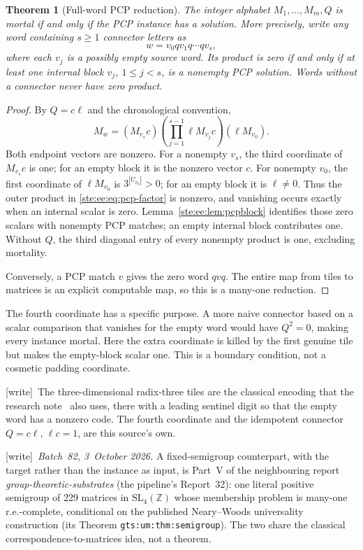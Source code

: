 \documentclass[11pt,letterpaper]{article}
\newtheorem{theorem}{Theorem}[section]
\theoremstyle{definition}
\theoremstyle{remark}
\newcommand{\wtag}{\textup{[write]}}
\begin{document}
\begin{theorem}[Full-word PCP reduction]\label{ste:ee:thm:pcp}
The integer alphabet $M_1,\ldots,M_m,Q$ is mortal if and only if the PCP instance
has a solution. More precisely, write any word containing $s\geq1$ connector
letters as
\[
 w=v_0qv_1q\cdots qv_s,
\]
where each $v_j$ is a possibly empty source word. Its product is zero if and only
if at least one internal block $v_j$, $1\leq j<s$, is a nonempty PCP solution.
Words without a connector never have zero product.
\end{theorem}
\begin{proof}
By $Q=c\ell$ and the chronological convention,
\begin{equation}
 M_w=(M_{v_s}c)
 \left(\prod_{j=1}^{s-1}\ell M_{v_j}c\right)(\ell M_{v_0}).
 \label{ste:ee:eq:pcp-factor}
\end{equation}
Both endpoint vectors are nonzero. For a nonempty $v_s$, the third coordinate of
$M_{v_s}c$ is one; for an empty block it is the nonzero vector $c$. For nonempty
$v_0$, the first coordinate of $\ell M_{v_0}$ is $3^{|U_{v_0}|}>0$; for an empty
block it is $\ell\ne0$. Thus the outer product in \eqref{ste:ee:eq:pcp-factor} is
nonzero, and vanishing occurs exactly when an internal scalar is zero.
Lemma~\ref{ste:ee:lem:pcpblock} identifies those zero scalars with nonempty PCP matches;
an empty internal block contributes one. Without $Q$, the third diagonal entry
of every nonempty product is one, excluding mortality.

Conversely, a PCP match $v$ gives the zero word $qvq$. The entire map from tiles
to matrices is an explicit computable map, so this is a many-one reduction.
\end{proof}

The fourth coordinate has a specific purpose. A more naive connector based on a
scalar comparison that vanishes for the empty word would have $Q^2=0$, making
every instance mortal. Here the extra coordinate is killed by the first genuine
tile but makes the empty-block scalar one. This is a boundary condition, not a
cosmetic padding coordinate.

\wtag\ The three-dimensional radix-three tiles are the classical encoding that the research note~\cite{matrixpcp} also uses, there with a leading sentinel digit so that the empty word has a nonzero code. The fourth coordinate and the idempotent connector $Q=c\ell$, $\ell c=1$, are this source's own.

\wtag\ \emph{Batch~82, 3~October 2026.} A fixed-semigroup counterpart, with the target rather than the instance as input, is Part~V of the neighbouring report \emph{group-theoretic-substrates} (the pipeline's Report~32): one literal positive semigroup of 229 matrices in $\mathrm{SL}_4(\mathbb Z)$ whose membership problem is many-one r.e.-complete, conditional on the published Neary--Woods universality construction (its Theorem \texttt{gts:um:thm:semigroup}). The two share the classical correspondence-to-matrices idea, not a theorem.
\end{document}

